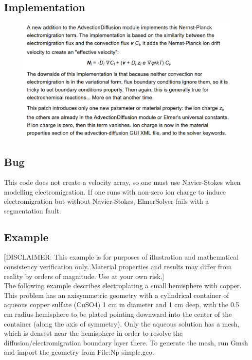\subsection{Implementation}

\begin{figure}[H]
\centering
\includegraphics[width=1.0\textwidth]{ec-21}
\end{figure}

\subsection{Bug}

This code does not create a velocity array, so one must use Navier-Stokes when modelling electromigration. If one runs with non-zero ion charge to induce electromigration but without Navier-Stokes, ElmerSolver fails with a segmentation fault. 

\subsection{Example}

[DISCLAIMER: This example is for purposes of illustration and mathematical consistency verification only. Material properties and results may differ from reality by orders of magnitude. Use at your own risk.] \\

The following example describes electroplating a small hemisphere with copper. This problem has an axisymmetric geometry with a cylindrical container of aqueous copper sulfate (CuSO4) 1 cm in diameter and 1 cm deep, with the 0.5 cm radius hemisphere to be plated pointing downward into the center of the container (along the axis of symmetry). Only the aqueous solution has a mesh, which is densest near the hemisphere in order to resolve the diffusion/electromigration boundary layer there. To generate the mesh, run Gmsh and import the geometry from File:Np-simple.geo.

